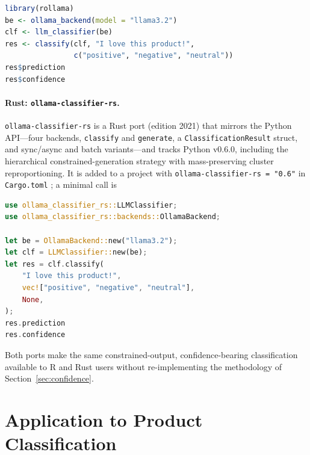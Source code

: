 \documentclass[11pt,a4paper]{article}
\begin{document}
\noindent\begin{minipage}{\linewidth}
\begin{lstlisting}[language=R, caption={Minimal classification call
  in R with \texttt{rollama}.}, label={lst:r-port}]
library(rollama)
be <- ollama_backend(model = "llama3.2")
clf <- llm_classifier(be)
res <- classify(clf, "I love this product!",
                c("positive", "negative", "neutral"))
res$prediction
res$confidence
\end{lstlisting}
\end{minipage}

\paragraph{Rust: \texttt{ollama-classifier-rs}.}
\texttt{ollama-classifier-rs} \citep{ollama-classifier-rs} is a Rust port
(edition 2021) that mirrors the Python API---four backends,
\texttt{classify} and \texttt{generate}, a \texttt{ClassificationResult}
struct, and sync/async and batch variants---and tracks Python v0.6.0,
including the hierarchical constrained-generation strategy with
mass-preserving cluster reproportioning. It is added to a project with
\texttt{ollama-classifier-rs = "0.6"} in \texttt{Cargo.toml} \citep{rust};
a minimal call is

\noindent\begin{minipage}{\linewidth}
\begin{lstlisting}[language=Rust, caption={Minimal classification
  call in Rust with \texttt{ollama-classifier-rs}.}, label={lst:rust-port}]
use ollama_classifier_rs::LLMClassifier;
use ollama_classifier_rs::backends::OllamaBackend;

let be = OllamaBackend::new("llama3.2");
let clf = LLMClassifier::new(be);
let res = clf.classify(
    "I love this product!",
    vec!["positive", "negative", "neutral"],
    None,
);
res.prediction
res.confidence
\end{lstlisting}
\end{minipage}

Both ports make the same constrained-output, confidence-bearing classification
available to R and Rust users without re-implementing the methodology of
Section~\ref{sec:confidence}.

\section{Application to Product Classification}
\label{sec:application}
\end{document}
